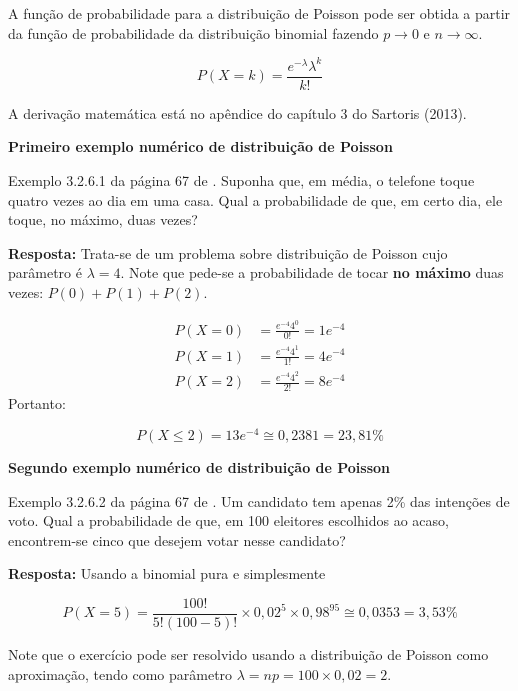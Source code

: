 \documentclass[
]{book}
\begin{document}
A função de probabilidade para a distribuição de Poisson pode ser obtida a partir da função de probabilidade da distribuição binomial fazendo \(p\rightarrow 0\) e \(n\rightarrow \infty\).

\begin{equation*}
  P(X=k) = \frac{e^{-\lambda}\lambda^{k}}{k!}
\end{equation*}

A derivação matemática está no apêndice do capítulo 3 do Sartoris (2013).

\textbf{Primeiro exemplo numérico de distribuição de Poisson}

Exemplo 3.2.6.1 da página 67 de \citet{Sartoris2013}. Suponha que, em média, o telefone toque quatro vezes ao dia em uma casa. Qual a probabilidade de que, em certo dia, ele toque, no máximo, duas vezes?

\textbf{Resposta:} Trata-se de um problema sobre distribuição de Poisson cujo parâmetro é \(\lambda= 4\). Note que pede-se a probabilidade de tocar
\textbf{no máximo} duas vezes: \(P(0) + P(1) + P(2)\).

\begin{align*}
  P(X=0) &=\frac{e^{-4}4^{0}}{0!} = 1e^{-4}\\
  P(X=1) &=\frac{e^{-4}4^{1}}{1!} = 4e^{-4}\\
  P(X=2) &=\frac{e^{-4}4^{2}}{2!} = 8e^{-4}
\end{align*}
Portanto:

\begin{equation*}
  P(X\leq 2) = 13e^{-4}\cong 0,2381 = 23,81\%
\end{equation*}

\textbf{Segundo exemplo numérico de distribuição de Poisson}

Exemplo 3.2.6.2 da página 67 de \citet{Sartoris2013}. Um candidato tem apenas 2\% das intenções de voto. Qual a probabilidade de que, em 100 eleitores escolhidos ao acaso, encontrem-se cinco que desejem votar nesse candidato?

\textbf{Resposta:} Usando a binomial pura e simplesmente

\begin{equation*}
  P(X=5) = \frac{100!}{5!(100-5)!}\times 0,02^5 \times 0,98^{95} \cong 0,0353 = 3,53\%
\end{equation*}

Note que o exercício pode ser resolvido usando a distribuição de Poisson como aproximação, tendo como parâmetro \(\lambda = np = 100\times0,02 = 2\).
\end{document}

